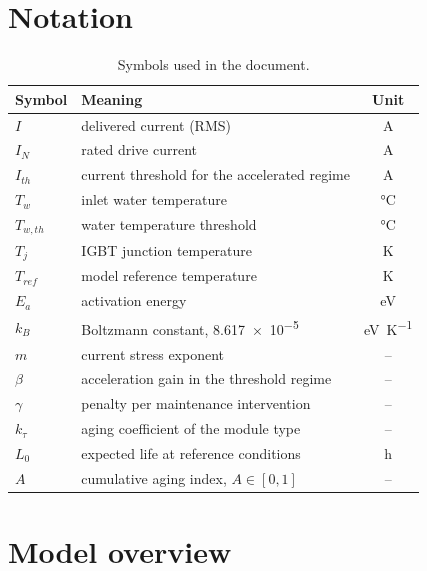 \documentclass[11pt,a4paper]{article}
\begin{document}
\section{Notation}

\begin{table}[h]
\centering
\begin{tabular}{llc}
\toprule
Symbol & Meaning & Unit \\
\midrule
$I$            & delivered current (RMS)                             & \si{\ampere} \\
$I_N$          & rated drive current                                 & \si{\ampere} \\
$I_{th}$       & current threshold for the accelerated regime        & \si{\ampere} \\
$T_w$          & inlet water temperature                             & \si{\degreeCelsius} \\
$T_{w,th}$     & water temperature threshold                         & \si{\degreeCelsius} \\
$T_j$          & IGBT junction temperature                           & \si{\kelvin} \\
$T_{ref}$      & model reference temperature                         & \si{\kelvin} \\
$E_a$          & activation energy                                   & \si{\electronvolt} \\
$k_B$          & Boltzmann constant, \num{8.617e-5}                  & \si{\electronvolt\per\kelvin} \\
$m$            & current stress exponent                             & -- \\
$\beta$        & acceleration gain in the threshold regime           & -- \\
$\gamma$       & penalty per maintenance intervention                & -- \\
$k_\tau$       & aging coefficient of the module type                & -- \\
$L_0$          & expected life at reference conditions               & \si{\hour} \\
$A$            & cumulative aging index, $A\in[0,1]$                 & -- \\
\bottomrule
\end{tabular}
\caption{Symbols used in the document.}
\end{table}

\section{Model overview}
\label{sec:schema}
\end{document}
